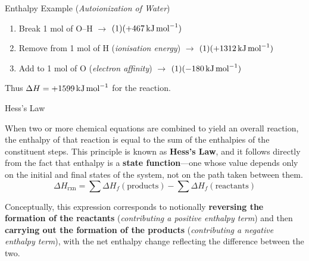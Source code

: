 \documentclass[10pt]{article}
\begin{document}
\begin{core}{Enthalpy Example (\textit{Autoionization of Water})}
      \begin{enumerate}[label=(\arabic*)]

        \item Break 1 mol of O--H $\rightarrow$ $(1)(+467\,\text{kJ\,mol}^{-1})$

        \item Remove  from 1 mol of H (\textit{ionisation energy}) $\rightarrow$ $(1)(+1312\,\text{kJ\,mol}^{-1})$

        \item Add  to 1 mol of O (\textit{electron affinity}) $\rightarrow$ $(1)(-180\,\text{kJ\,mol}^{-1})$

      \end{enumerate}

      Thus $\Delta H = +1599\,\text{kJ\,mol}^{-1}$ for the reaction.

    \end{core}

    \begin{core}{Hess's Law}

      When two or more chemical equations are combined to yield an overall reaction, the enthalpy of that reaction is equal to the sum of the enthalpies of the constituent steps. This principle is known as \textbf{Hess's Law}, and it follows directly from the fact that enthalpy is a \textbf{state function}---one whose value depends only on the initial and final states of the system, not on the path taken between them.
      \[
        \Delta H_{\text{rxn}} = \sum \Delta H_{f}(\text{products}) - \sum \Delta H_{f}(\text{reactants})
      \]

      Conceptually, this expression corresponds to notionally \textbf{reversing the formation of the reactants} (\textit{contributing a positive enthalpy term}) and then \textbf{carrying out the formation of the products} (\textit{contributing a negative enthalpy term}), with the net enthalpy change reflecting the difference between the two.

    \end{core}
\end{document}
